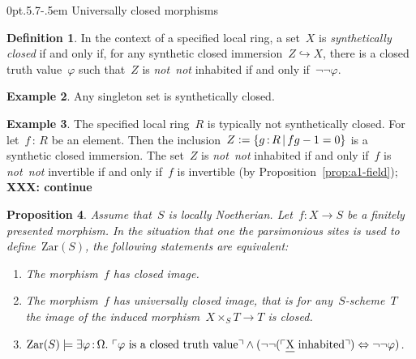 \documentclass[10pt,reqno,a4paper]{amsbook}
\makeatletter
\theoremstyle{definition}
\newtheorem{defn}{Definition}[section]
\newtheorem{ex}[defn]{Example}
\theoremstyle{plain}
\newtheorem{prop}[defn]{Proposition}
\theoremstyle{remark}
\let\oldul\ul
\renewcommand{\ul}[1]{\text{\oldul{$#1$}}}
\newcommand{\Zar}{\mathrm{Zar}}
\newcommand{\?}{\,{:}\,}
\renewcommand{\_}{\mathpunct{.}\,}
\newcommand{\speak}[1]{\ulcorner\text{\textnormal{#1}}\urcorner}
\newcommand{\notnot}{\emph{not~not}\xspace}
\newcommand{\XXX}[1]{\textbf{XXX: #1}}
\newcommand{\defeq}{\vcentcolon=}
\def\subsection{\@startsection{subsection}{2}%
  {0pt}{.5\linespacing\@plus.7\linespacing}{-.5em}%
  {\normalfont\bfseries}}
\makeatother
\begin{document}
\subsection{Universally closed morphisms}

\begin{defn}In the context of a specified local ring, a set~$X$ is
\emph{synthetically closed} if and only if, for any synthetic closed
immersion~$Z \hookrightarrow X$, there is a closed truth value~$\varphi$ such
that~$Z$ is \notnot inhabited if and only if~$\neg\neg\varphi$.
\end{defn}

\begin{ex}Any singleton set is synthetically closed.\end{ex}

\begin{ex}The specified local ring~$R$ is typically not synthetically closed.
For let~$f \? R$ be an element. Then the inclusion~$Z \defeq \{ g \? R \,|\,
fg - 1 = 0 \}$ is a synthetic closed immersion. The set~$Z$ is \notnot inhabited if and
only if~$f$ is \notnot invertible if and only if~$f$ is invertible (by
Proposition~\ref{prop:a1-field}); \XXX{continue}\end{ex}

\begin{prop}\label{prop:char-closed-image}
Assume that~$S$ is locally Noetherian. Let~$f : X \to S$ be a
finitely presented morphism. In the situation that one the parsimonious
sites is used to define~$\Zar(S)$, the following statements are equivalent:
\begin{enumerate}
\item The morphism~$f$ has closed image.
\item The morphism~$f$ has universally closed image, that is for
any~$S$-scheme~$T$ the image of the induced morphism~$X \times_S T \to T$ is
closed.
\item $\Zar(S) \models \exists \varphi\?\Omega\_
  \speak{$\varphi$ is a closed truth value} \wedge
  (\neg\neg(\speak{$\ul{X}$ inhabited}) \Leftrightarrow \neg\neg\varphi)$.
\end{enumerate}
\end{prop}
\end{document}
